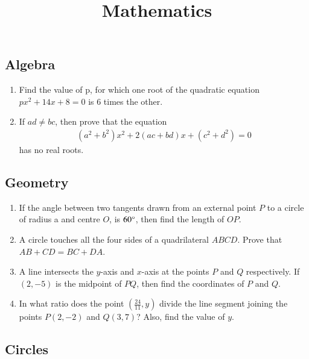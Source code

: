 \documentclass[12pt,-letter paper]{article}
\title{\textbf{Mathematics}}
\date{}
\providecommand{\brak}[1]{\ensuremath{\left(#1\right)}}
\begin{document}
\maketitle{}
\begin{center}
\section*{Algebra}
\end{center}
\begin{enumerate}
\item Find the value of p, for which one root of the quadratic equation $px^{2}+ 14x + 8 = 0$ is 6 times the other.
\item If $ad \neq bc$, then prove that the equation
	\begin{align}
		\brak{a^2 + b^2}x^2 + 2\brak{ac + bd}x+ \brak{c^2 + d^2} = 0
	\end{align}
    has no real roots.
\end{enumerate}
\begin{center}
\section*{Geometry}
\end{center}
\begin{enumerate}
	\item If the angle between two tangents drawn from an external point $P$ to a circle of radius a and centre $O$, is $60{\degree}$, then find the length of $OP$.
\item A circle touches all the four sides of a quadrilateral $ABCD$. Prove that $AB + CD = BC + DA$.
\item A line intersects the $y$-axis and $x$-axis at the points $P$ and $Q$ respectively. If $\brak{2, -5}$ is the midpoint of $PQ$, then find the coordinates of $P$ and $Q$.
\item In what ratio does the point $\brak{\frac{24}{11}, y}$ divide the line segment joining the points $P\brak{2, -2}$ and $Q\brak{3, 7}$? Also, find the value of $y$.
\end{enumerate}
\begin{center}
\section*{Circles}
\end{center}
\end{document}
